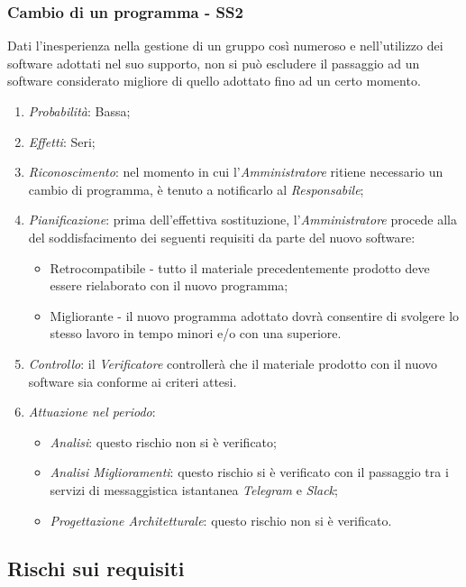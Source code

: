 \subsubsection{Cambio di un programma - SS2}
Dati l'inesperienza nella gestione di un gruppo cos\`i numeroso e nell'utilizzo dei software adottati nel suo supporto, non si pu\`o escludere il passaggio ad un software considerato migliore di quello adottato fino ad un certo momento.
\begin{enumerate}
\item \textit{Probabilit\`a}: Bassa;
\item \textit{Effetti}: Seri;
\item \textit{Riconoscimento}: nel momento in cui l'\textit{Amministratore} ritiene necessario un cambio di programma, è tenuto a notificarlo al \textit{Responsabile};
\item \textit{Pianificazione}: prima dell'effettiva sostituzione, l'\textit{Amministratore} procede alla  del soddisfacimento dei seguenti requisiti da parte del nuovo software:
  \begin{itemize}
    \item Retrocompatibile - tutto il materiale precedentemente prodotto deve essere rielaborato con il nuovo programma;
    \item Migliorante - il nuovo programma adottato dovr\`a consentire di svolgere lo stesso lavoro in tempo minori e/o con una  superiore.
  \end{itemize}
\item \textit{Controllo}: il \textit{Verificatore} controller\`a che il materiale prodotto con il nuovo software sia conforme ai criteri attesi.
\item \textit{Attuazione nel periodo}: 
	\begin{itemize}
	\item \textit{Analisi}: questo rischio non si è verificato;
	\item \textit{Analisi Miglioramenti}: questo rischio si è verificato con il passaggio tra i servizi di messaggistica istantanea \textit{Telegram} e \textit{Slack};
	\item \textit{Progettazione Architetturale}: questo rischio non si è verificato.
	\end{itemize}
\end{enumerate}

\subsection{Rischi sui requisiti}

